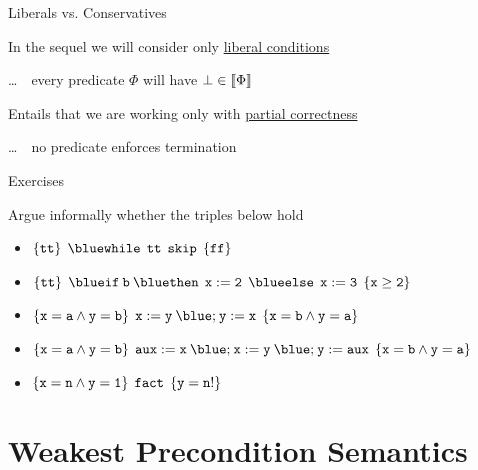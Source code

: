 \documentclass{beamer}
\begin{document}
\begin{frame}{Liberals vs. Conservatives}

        In the sequel we will consider only \alert{\underline{liberal conditions}}

        \dots \, \ie\ every predicate $\Phi$ will have $\bot \in \llbracket \Phi \rrbracket$

        \bigskip
        Entails that we are working only with \alert{\underline{partial correctness}}

        \dots \, \ie\ no predicate enforces termination
\end{frame}

\begin{frame}{Exercises}

        Argue informally whether the triples below hold
        \\[7pt]
        \begin{itemize}
                \item $\{ \prog{tt} \} \> \> \prog{{\blue while} \> \> tt \> \> skip} \> \> \{ \prog{ff} \}$
                        \\[7pt]
                \item $\{ \prog{tt} \} \> \> \prog{{\blue if} \>  b \> {\blue then} \> \> 
                        x:=2 \> \> {\blue else} \> \> x:= 3} \> \> \{ \prog{x \geq 2} \}$
                        \\[7pt]
                \item $\{ \prog{x = a \wedge y = b} \} \> \>
                        \prog{x:= y \> {\blue ;} \> y := x} \> \> \{ \prog{ x = b \wedge y = a }\}$
                        \\[7pt]
                \item $\{ \prog{x = a \wedge y = b} \} \> \>
                        \prog{aux := x \> {\blue ;} \> 
                        x:= y \> {\blue ;} \> y := aux} \> \> \{ \prog{ x = b \wedge y = a }\}$
                        \\[7pt]
                \item $\{ \mathtt{x =n \wedge y = 1} \} \> \> \mathtt{fact} \> \> \{ \mathtt{y = n!} \}$
        \end{itemize}
\end{frame}

\section{Weakest Precondition Semantics}
\end{document}
